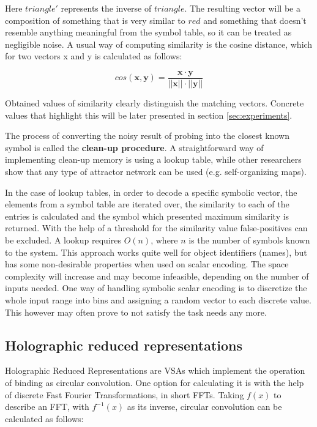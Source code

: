 \documentclass[conference]{IEEEtran}
\begin{document}
	Here $triangle'$ represents the inverse of $triangle$.
The resulting vector will be a composition of something that is very similar to $red$ and something that doesn't resemble anything meaningful from the symbol table, so it can be treated as negligible noise.	A usual way of computing similarity is the cosine distance, which for two vectors \pmb x and \pmb y is calculated as follows:
	
	\begin{equation}
cos(\pmb x, \pmb y) = \frac {\pmb x \cdot \pmb y}{||\pmb x|| \cdot ||\pmb y||}
	\end{equation} 
	
	Obtained values of similarity clearly distinguish the matching vectors. Concrete values that highlight this will be later presented in section \ref{sec:experiments}.	

	The process of converting the noisy result of probing into the closest known symbol is called the \textbf{clean-up procedure}.
A straightforward way of implementing clean-up memory is using a lookup table, while other researchers show that any type of attractor network can be used (e.g. self-organizing maps).

	In the case of lookup tables, in order to decode a specific symbolic vector, the elements from a symbol table are iterated over, the similarity to each of the entries is calculated and the symbol which presented maximum similarity is returned. With the help of a threshold for the similarity value false-positives can be excluded. A lookup requires $O(n)$, where $n$ is the number of symbols known to the system. This approach works quite well for object identifiers (names), but has some non-desirable properties when used on scalar encoding. The space complexity will increase and may become infeasible, depending on the number of inputs needed. One way of handling symbolic scalar encoding is to discretize the whole input range into bins and assigning a random vector to each discrete value. This however may often prove to not satisfy the task needs any more.

	
	\subsection{Holographic reduced representations}
	\label{sec:hrr}
	
	Holographic Reduced Representations are VSAs which implement the operation of binding as circular convolution. One option for calculating it is with the help of discrete Fast Fourier Transformations, in short FFTs. Taking $f(x)$ to describe an FFT, with $f^{-1}(x)$ as its inverse, circular convolution can be calculated as follows:
	
\end{document}
